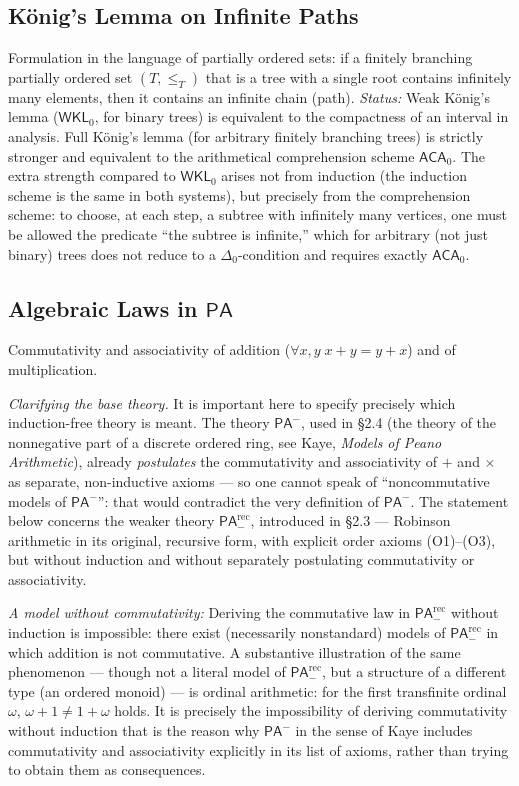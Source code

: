 \documentclass[12pt,a4paper]{article}
\theoremstyle{plain}
\theoremstyle{definition}
\newcommand{\PA}{\textsf{PA}}
\newcommand{\PArec}{\PA^{\mathrm{rec}}_{-}}
\begin{document}
\subsection{König's Lemma on Infinite Paths}
Formulation in the language of partially ordered sets: if a finitely branching partially ordered set $(T, \leqslant_T)$ that is a tree with a single root contains infinitely many elements, then it contains an infinite chain (path).
\textit{Status:} Weak König's lemma ($\textsf{WKL}_0$, for binary trees) is equivalent to the compactness of an interval in analysis. Full König's lemma (for arbitrary finitely branching trees) is strictly stronger and equivalent to the arithmetical comprehension scheme $\textsf{ACA}_0$. The extra strength compared to $\textsf{WKL}_0$ arises not from induction (the induction scheme is the same in both systems), but precisely from the comprehension scheme: to choose, at each step, a subtree with infinitely many vertices, one must be allowed the predicate ``the subtree is infinite,'' which for arbitrary (not just binary) trees does not reduce to a $\Delta_0$-condition and requires exactly $\textsf{ACA}_0$.

\subsection{Algebraic Laws in $\PA$}
Commutativity and associativity of addition ($\forall x, y \; x+y = y+x$) and of multiplication.

\textit{Clarifying the base theory.} It is important here to specify precisely which induction-free theory is meant. The theory $\PA^-$, used in §2.4 (the theory of the nonnegative part of a discrete ordered ring, see Kaye, \textit{Models of Peano Arithmetic}), already \emph{postulates} the commutativity and associativity of $+$ and $\times$ as separate, non-inductive axioms --- so one cannot speak of ``noncommutative models of $\PA^-$'': that would contradict the very definition of $\PA^-$. The statement below concerns the weaker theory $\PArec$, introduced in §2.3 --- Robinson arithmetic in its original, recursive form, with explicit order axioms (O1)--(O3), but without induction and without separately postulating commutativity or associativity.

\textit{A model without commutativity:} Deriving the commutative law in $\PArec$ without induction is impossible: there exist (necessarily nonstandard) models of $\PArec$ in which addition is not commutative. A substantive illustration of the same phenomenon --- though not a literal model of $\PArec$, but a structure of a different type (an ordered monoid) --- is ordinal arithmetic: for the first transfinite ordinal $\omega$, $\omega + 1 \neq 1 + \omega$ holds. It is precisely the impossibility of deriving commutativity without induction that is the reason why $\PA^-$ in the sense of Kaye includes commutativity and associativity explicitly in its list of axioms, rather than trying to obtain them as consequences.
\end{document}
